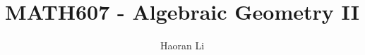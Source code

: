 \documentclass[a4paper,10pt]{article}
\title{MATH607 - Algebraic Geometry II}
\author{Haoran Li}
\begin{document}
\sloppy %

\maketitle
\tableofcontents
\newpage







\begin{thebibliography}{}



\end{thebibliography}

\printindex
\newpage
\end{document}

